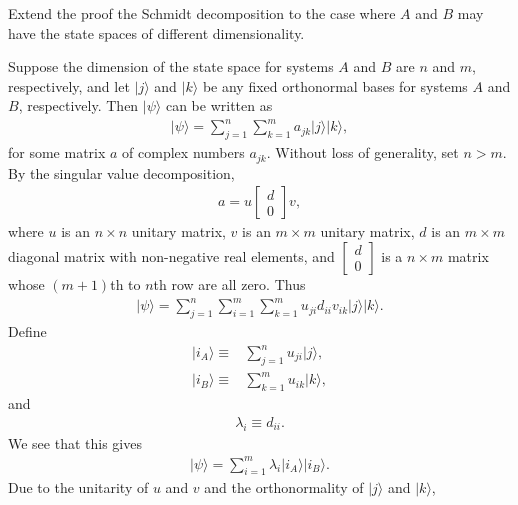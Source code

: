 \documentclass[en]{sol-man}
\begin{document}
\begin{exe}
    Extend the proof the Schmidt decomposition to the case where $A$ and $B$ may have the state spaces of different dimensionality.
\end{exe}
\begin{pf}
    Suppose the dimension of the state space for systems $A$ and $B$ are $n$ and $m$, respectively, and let $\lvert j\rangle$ and $\lvert k\rangle$ be any fixed orthonormal bases for systems $A$ and $B$, respectively.
    Then $\lvert\psi\rangle$ can be written as
    \begin{align}
        \lvert\psi\rangle=\sum_{j=1}^n\sum_{k=1}^ma_{jk}\lvert j\rangle\lvert k\rangle,
    \end{align}
    for some matrix $a$ of complex numbers $a_{jk}$.
    Without loss of generality, set $n>m$. By the singular value decomposition,
    \begin{align}
        a=u\begin{bmatrix}
            d\\
            0
        \end{bmatrix}v,
    \end{align}
    where $u$ is an $n\times n$ unitary matrix, $v$ is an $m\times m$ unitary matrix, $d$ is an $m\times m$ diagonal matrix with non-negative real elements, and $\left[\begin{smallmatrix}
        d\\
        0
    \end{smallmatrix}\right]$ is a $n\times m$ matrix whose $(m+1)$th to $n$th row are all zero.
    Thus
    \begin{align}
        \lvert\psi\rangle=\sum_{j=1}^n\sum_{i=1}^m\sum_{k=1}^mu_{ji}d_{ii}v_{ik}\lvert j\rangle\lvert k\rangle.
    \end{align}
    Define
    \begin{align}
        \lvert i_A\rangle\equiv&\sum_{j=1}^nu_{ji}\lvert j\rangle,\\
        \lvert i_B\rangle\equiv&\sum_{k=1}^mu_{ik}\lvert k\rangle,
    \end{align}
    and
    \begin{align}
        \lambda_i\equiv d_{ii}.
    \end{align}
    We see that this gives
    \begin{align}
        \lvert\psi\rangle=\sum_{i=1}^m\lambda_i\lvert i_A\rangle\lvert i_B\rangle.
    \end{align}
    Due to the unitarity of $u$ and $v$ and the orthonormality of $\lvert j\rangle$ and $\lvert k\rangle$,

\end{pf}
\end{document}
